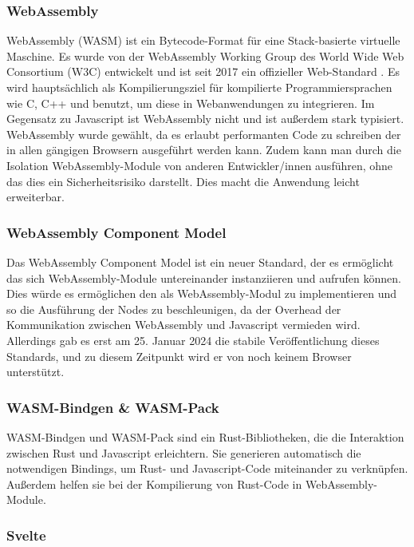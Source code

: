 \documentclass[ngerman]{article}
\begin{document}
\subsubsection{WebAssembly}
WebAssembly (WASM) ist ein Bytecode-Format für eine Stack-basierte virtuelle Maschine. Es wurde von der WebAssembly Working Group des World Wide Web Consortium (W3C) entwickelt und ist seit 2017 ein offizieller Web-Standard \cite{Haas2017}. 
\br
Es wird hauptsächlich als Kompilierungsziel für kompilierte Programmiersprachen wie C, C++ und  benutzt, um diese in Webanwendungen zu integrieren. Im Gegensatz zu Javascript ist WebAssembly nicht  und ist außerdem stark typisiert.
\br
WebAssembly wurde gewählt, da es erlaubt performanten Code zu schreiben der in allen gängigen Browsern ausgeführt werden kann. 
Zudem kann man durch die Isolation WebAssembly-Module von anderen Entwickler/innen ausführen, ohne das dies ein Sicherheitsrisiko darstellt. Dies macht die Anwendung leicht erweiterbar.
\subsubsection*{WebAssembly Component Model}
Das WebAssembly Component Model ist ein neuer Standard, der es ermöglicht das sich WebAssembly-Module untereinander instanziieren und aufrufen können. \cite{bytecodeallianceIntroductionWebAssembly} 
Dies würde es ermöglichen den  als WebAssembly-Modul zu implementieren und so die Ausführung der Nodes zu beschleunigen, da der Overhead der Kommunikation zwischen WebAssembly und Javascript vermieden wird. Allerdings gab es erst am 25. Januar 2024 die stabile Veröffentlichung dieses Standards, und zu diesem Zeitpunkt wird er von noch keinem Browser unterstützt.

\subsubsection{WASM-Bindgen \& WASM-Pack}
\label{sec:WASM-Bindgen}

WASM-Bindgen und WASM-Pack sind ein Rust-Bibliotheken, die die Interaktion zwischen Rust und Javascript erleichtern. Sie generieren automatisch die notwendigen Bindings, um Rust- und Javascript-Code miteinander zu verknüpfen. Außerdem helfen sie bei der Kompilierung von Rust-Code in WebAssembly-Module. 
\cite{rustwasmIntroductionwasmbindgen}

\subsubsection{Svelte}
\label{sec:Svelte}
\end{document}
